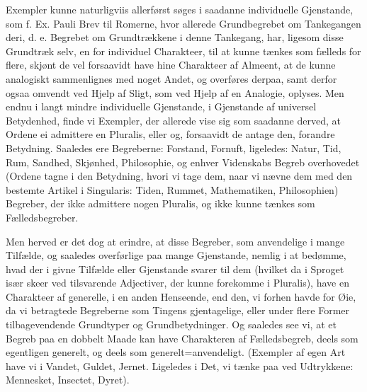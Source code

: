 \documentclass[12pt]{book}
\def\sperr#1{#1}%
\def\textit#1{#1}%
\def\emph#1{#1}%
\newcommand{\sperr}[1]{\textls[180]{#1}}
\newcommand{\opage}[1]{\marginnote{\footnotesize\textit{[#1]}}}
\begin{document}
Exempler kunne naturligviis allerførst søges i saadanne individuelle Gjenstande, som
f. Ex. Pauli Brev til Romerne, hvor allerede Grundbegrebet om Tankegangen deri, d. e.
Begrebet om Grundtrækkene i denne Tankegang, har, ligesom disse Grundtræk selv, en
for individuel Charakteer, til at kunne tænkes som fælleds for flere, skjønt de vel
forsaavidt have hine Charakteer af Almeent, at de kunne analogiskt sammenlignes med
noget Andet, og overføres derpaa, samt derfor ogsaa omvendt ved Hjelp af Sligt, som
ved Hjelp af en Analogie, oplyses. Men endnu i langt mindre individuelle Gjenstande,
i Gjenstande af universel Betydenhed, finde vi Exempler, der allerede vise sig som
saadanne derved, at Ordene ei admittere en Pluralis, eller og, forsaavidt de antage
den, forandre Betydning. Saaledes ere Begreberne: Forstand, Fornuft, ligeledes:
Natur, Tid, Rum, Sandhed, Skjønhed, Philosophie, og enhver Videnskabs Begreb
overhovedet (Ordene tagne i
\opage{146} den Betydning, hvori vi tage dem, naar vi nævne dem med den bestemte Artikel i
Singularis: Tiden, Rummet, Mathematiken, Philosophien) Begreber, der ikke admittere
nogen Pluralis, og ikke kunne tænkes som Fælledsbegreber.

Men herved er det dog at erindre, at disse Begreber, som anvendelige i mange
Tilfælde, og saaledes overførlige paa mange Gjenstande, nemlig i at bedømme, hvad der
i givne Tilfælde eller Gjenstande svarer til dem (hvilket da i Sproget især skeer ved
tilsvarende Adjectiver, der kunne forekomme i Pluralis), have en Charakteer af
\emph{generelle}, i en anden Henseende, end den, vi forhen havde for Øie, da vi
betragtede Begreberne som Tingens gjentagelige, eller under flere Former
tilbagevendende Grundtyper og Grundbetydninger. Og saaledes see vi, at et Begreb paa
en dobbelt Maade kan have Charakteren af Fælledsbegreb, deels som egentligen
\emph{generelt}, og deels som \emph{\sperr{generelt}=anvendeligt}. (Exempler af egen
Art have vi i Vandet, Guldet, Jernet. Ligeledes i Det, vi tænke paa ved Udtrykkene:
Mennesket, Insectet, Dyret).
\end{document}
